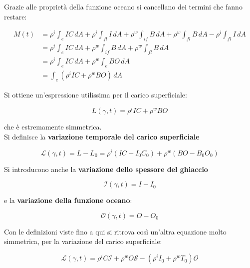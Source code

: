 \documentclass[a4paper,12pt]{book}
\begin{document}
\noindent Grazie alle proprietà della funzione oceano si cancellano dei termini che fanno restare:

\begin{align}
M(t) &= \rho^i \int_e IC \,dA + \rho^i \int_{fl} I \,dA + \rho^w \int_{if} B \,dA + \rho^w \int_{fl} B \,dA - \rho^i \int_{fl} I \,dA \\[1ex]
     &= \rho^i \int_e IC \,dA + \rho^w \int_{if} B \,dA + \rho^w \int_{fl} B \,dA \\[1ex]
     &= \rho^i \int_e IC \,dA + \rho^w \int_e BO \,dA \\[1ex]
     &= \int_e (\rho^i IC + \rho^w BO) \,dA
\end{align}

\noindent Si ottiene un'espressione utilissima per il carico superficiale:

\begin{equation}
    L(\gamma , t) = \rho ^i I C + \rho^ w BO
\end{equation}

\noindent
che è estremamente simmetrica.\\

\noindent
Si definisce la \textbf{variazione temporale del carico superficiale}

\begin{equation}
    \mathcal{L}(\gamma,t) = L - L_0 = \rho^i (IC - I_0C_0) + \rho^w(BO-B_0O_0)
\end{equation}

\noindent
Si introducono anche la \textbf{variazione dello spessore del ghiaccio}

\begin{equation}
    \mathcal{I}(\gamma, t) = I - I_0
\end{equation}

\noindent
e la \textbf{variazione della funzione oceano}:

\begin{equation}
    \mathcal{O}(\gamma, t) = O - O_0
\end{equation}

\noindent
Con le definizioni viste fino a qui si ritrova così un’altra equazione molto simmetrica, per la variazione del carico superficiale:

\begin{equation}
    \mathcal{L}(\gamma, t) = \rho^i C\mathcal{I} + \rho^w O\mathcal{S} - (\rho^i I_0 + \rho^w T_0)\mathcal{O}
    \label{eq:variazione_carico}
\end{equation}
\end{document}
